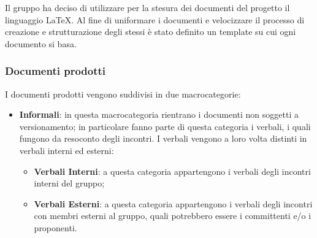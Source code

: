 Il gruppo ha deciso di utilizzare per la stesura dei documenti del progetto il linguaggio \LaTeX. Al fine di
uniformare i documenti e velocizzare il processo di creazione e strutturazione degli stessi è stato definito un
template su cui ogni documento si basa.

\subsubsection{Documenti prodotti}
\label{ssub:documenti_prodotti}

I documenti prodotti vengono suddivisi in due macrocategorie:
\begin{itemize}
    \item \textbf{Informali}: in questa macrocategoria rientrano i documenti non soggetti a versionamento; in
    particolare fanno parte di questa categoria i verbali, i quali fungono da resoconto degli incontri. I verbali
    vengono a loro volta distinti in verbali interni ed esterni:
    \begin{itemize}
        \item \textbf{Verbali Interni}: a questa categoria appartengono i verbali degli incontri interni del gruppo;
        \item \textbf{Verbali Esterni}: a questa categoria appartengono i verbali degli incontri con membri esterni al
        gruppo, quali potrebbero essere i committenti e/o i proponenti.
    \end{itemize}


\end{itemize}
